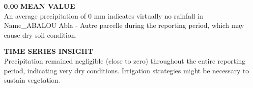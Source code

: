 \documentclass[12pt,a4paper]{article}
\begin{document}
\vspace{0.5cm}

\parbox{\textwidth}{ %
    \begin{minipage}[t]{0.48\textwidth}
        \vspace{0.3cm}
        \textbf{\Large{0.00}}
        \vspace{0.3cm}
        \textbf{MEAN VALUE}\\
        An average precipitation of 0 mm indicates virtually no rainfall in Name\_ABALOU Abla - Autre parcelle during the reporting period, which may cause dry soil condition.
        \vspace{0.5cm}

        \textbf{TIME SERIES INSIGHT}\\
        Precipitation remained negligible (close to zero) throughout the entire reporting period, indicating very dry conditions. Irrigation strategies might be necessary to sustain vegetation.
    \end{minipage}\hfill
    \begin{minipage}[t]{0.48\textwidth}
        \begin{center}
\end{center}
\end{minipage}}
\end{document}
